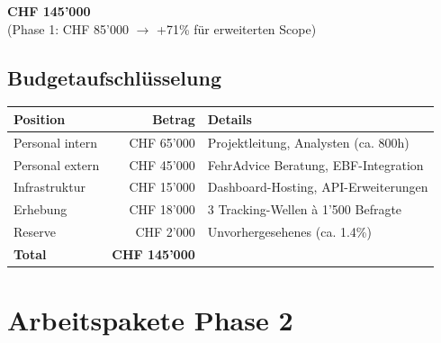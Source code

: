 \documentclass[11pt,a4paper]{article}
\begin{document}
\begin{center}
\end{center}

\begin{tcolorbox}[infobox={Gesamtbudget Phase 2}]
\centering
\textbf{\Large CHF 145'000}\\[0.5em]
\small (Phase 1: CHF 85'000 $\rightarrow$ +71\% für erweiterten Scope)
\end{tcolorbox}

\subsection{Budgetaufschlüsselung}

\begin{tabular}{l r p{6cm}}
\toprule
\textbf{Position} & \textbf{Betrag} & \textbf{Details}\\
\midrule
\rowcolor{falightgray} Personal intern & CHF 65'000 & Projektleitung, Analysten (ca. 800h)\\
Personal extern & CHF 45'000 & FehrAdvice Beratung, EBF-Integration\\
\rowcolor{falightgray} Infrastruktur & CHF 15'000 & Dashboard-Hosting, API-Erweiterungen\\
Erhebung & CHF 18'000 & 3 Tracking-Wellen à 1'500 Befragte\\
\rowcolor{falightgray} Reserve & CHF 2'000 & Unvorhergesehenes (ca. 1.4\%)\\
\midrule
\textbf{Total} & \textbf{CHF 145'000} & \\
\bottomrule
\end{tabular}

\newpage

\section{Arbeitspakete Phase 2}
\end{document}
